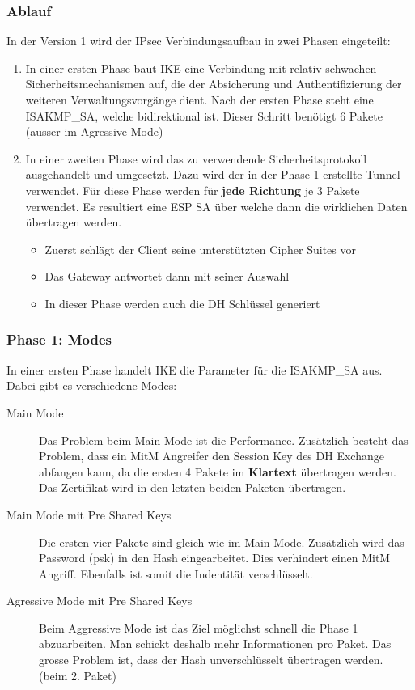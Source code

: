\subsubsection{Ablauf}
In der Version 1 wird der IPsec Verbindungsaufbau in zwei Phasen eingeteilt:
\begin{enumerate}
	\item In einer ersten Phase baut IKE eine Verbindung mit relativ schwachen Sicherheitsmechanismen auf, die der Absicherung und Authentifizierung der weiteren Verwaltungsvorgänge dient. Nach der ersten Phase steht eine ISAKMP\_SA, welche bidirektional ist. Dieser Schritt benötigt 6 Pakete (ausser im Agressive Mode)
	\item In einer zweiten Phase wird das zu verwendende Sicherheitsprotokoll ausgehandelt und umgesetzt. Dazu wird der in der Phase 1 erstellte Tunnel verwendet. Für diese Phase werden für \textbf{jede Richtung} je 3 Pakete verwendet. Es resultiert eine ESP SA über welche dann die wirklichen Daten übertragen werden.
	\begin{itemize}
		\item Zuerst schlägt der Client seine unterstützten Cipher Suites vor
		\item Das Gateway antwortet dann mit seiner Auswahl
		\item In dieser Phase werden auch die DH Schlüssel generiert
	\end{itemize}
\end{enumerate}



\clearpage

\subsubsection{Phase 1: Modes}
In einer ersten Phase handelt IKE die Parameter für die ISAKMP\_SA aus. Dabei gibt es verschiedene Modes:
\begin{description}
	\item[Main Mode] Das Problem beim Main Mode ist die Performance. Zusätzlich besteht das Problem, dass ein MitM Angreifer den Session Key des DH Exchange abfangen kann, da die ersten 4 Pakete im \textbf{Klartext} übertragen werden. Das Zertifikat wird in den letzten beiden Paketen übertragen.
	\item[Main Mode mit Pre Shared Keys] Die ersten vier Pakete sind gleich wie im Main Mode. Zusätzlich wird das Password (\gls{psk}) in den Hash eingearbeitet. Dies verhindert einen MitM Angriff. Ebenfalls ist somit die Indentität verschlüsselt.
	\item[Agressive Mode mit Pre Shared Keys] Beim Aggressive Mode ist das Ziel möglichst schnell die Phase 1 abzuarbeiten. Man schickt deshalb mehr Informationen pro Paket. Das grosse Problem ist, dass der Hash unverschlüsselt übertragen werden. (beim 2. Paket)
\end{description}

